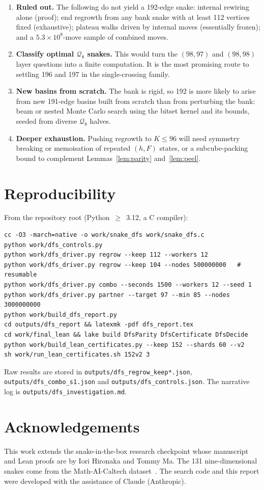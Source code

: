 \documentclass[11pt,a4paper]{article}
\theoremstyle{definition}
\newcommand{\Q}{\mathcal{Q}}
\begin{document}
\begin{enumerate}[leftmargin=*]
\item \textbf{Ruled out.} The following do not yield a 192-edge snake: internal rewiring alone (proof); end regrowth from any bank snake with at least 112 vertices fixed (exhaustive); plateau walks driven by internal moves (essentially frozen); and a $5.3\times10^8$-move sample of combined moves.
\item \textbf{Classify optimal $\Q_8$ snakes.} This would turn the $(98,97)$ and $(98,98)$ layer questions into a finite computation. It is the most promising route to settling 196 and 197 in the single-crossing family.
\item \textbf{New basins from scratch.} The bank is rigid, so 192 is more likely to arise from new 191-edge basins built from scratch than from perturbing the bank: beam or nested Monte Carlo search using the bitset kernel and its bounds, seeded from diverse $\Q_8$ halves.
\item \textbf{Deeper exhaustion.} Pushing regrowth to $K\le 96$ will need symmetry breaking or memoisation of repeated $(h,F)$ states, or a subcube-packing bound to complement Lemmas~\ref{lem:parity} and~\ref{lem:peel}.
\end{enumerate}

\section*{Reproducibility}
From the repository root (Python~$\ge$~3.12, a C compiler):
\begin{verbatim}
cc -O3 -march=native -o work/snake_dfs work/snake_dfs.c
python work/dfs_controls.py
python work/dfs_driver.py regrow --keep 112 --workers 12
python work/dfs_driver.py regrow --keep 104 --nodes 500000000   # resumable
python work/dfs_driver.py combo --seconds 1500 --workers 12 --seed 1
python work/dfs_driver.py partner --target 97 --min 85 --nodes 3000000000
python work/build_dfs_report.py
cd outputs/dfs_report && latexmk -pdf dfs_report.tex
cd work/final_lean && lake build DfsParity DfsCertificate DfsDecide
python work/build_lean_certificates.py --keep 152 --shards 60 --v2
sh work/run_lean_certificates.sh 152v2 3
\end{verbatim}
Raw results are stored in \texttt{outputs/dfs\_regrow\_keep*.json}, \texttt{outputs/dfs\_combo\_s1.json} and \texttt{outputs/dfs\_controls.json}. The narrative log is \texttt{outputs/dfs\_investigation.md}.

\section*{Acknowledgements}
This work extends the snake-in-the-box research checkpoint whose manuscript and Lean proofs are by Iori Hironaka and Tommy Ma. The 131 nine-dimensional snakes come from the Math-AI-Caltech dataset~\cite{data,orland}. The search code and this report were developed with the assistance of Claude (Anthropic).
\end{document}
